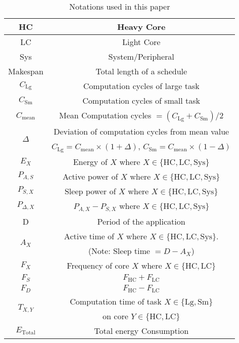 \begin{table}[t]
\caption{Notations used in this paper}
\label{table:notation}
\centering
\noindent\begin{tabular}{|c|c|}
\hline 
HC & Heavy Core \\ 
\hline 
LC & Light Core \\ 
\hline 
Sys & System/Peripheral \\ 
\hline 
Makespan & Total length of a schedule \\ 
\hline  
$C_\mathrm{Lg}$ & Computation cycles of large task\\ 
\hline 
$C_\mathrm{Sm}$ & Computation cycles of small task\\ 
\hline 
$C_\mathrm{mean}$ & Mean Computation cycles $= (C_\mathrm{Lg}+C_\mathrm{Sm})/2$  \\ 
\hline  
\multirow{2}{*}{$\Delta$}& \footnotesize Deviation of computation cycles from mean value\\ &\footnotesize$C_\mathrm{Lg}=C_\mathrm{mean}\times(1+\Delta)$, $C_\mathrm{Sm}=C_\mathrm{mean}\times(1-\Delta)$\\
\hline
$E_X$ & \footnotesize Energy of $X$ where $X\in \{\mathrm{HC},\mathrm{LC}, \mathrm{Sys}\}$ \\ 
\hline
$P_{A, S}$ & \footnotesize Active power of $X$ where $X\in \{\mathrm{HC},\mathrm{LC}, \mathrm{Sys}\}$\\ 
\hline 
$P_{S, X}$ & \footnotesize Sleep power of $X$ where $X\in \{\mathrm{HC},\mathrm{LC}, \mathrm{Sys}\}$ \\ 
\hline
$P_{\Delta,X}$& $P_{A, X}-P_{S, X}$ where $X\in \{\mathrm{HC},\mathrm{LC}, \mathrm{Sys}\}$\\
\hline  
D & Period of the application \\ 
\hline 
\multirow{2}{*}{$A_{X}$} & \footnotesize Active time of $X$ where $X\in \{\mathrm{HC},\mathrm{LC}, \mathrm{Sys}\}$.\\& (Note: Sleep time $= D-A_{X}$) \\ 
\hline
$F_{X}$ & Frequency of core $X$ where $X\in\{\mathrm{HC, LC}\}$ \\ 
\hline
$F_{S}$ & $F_{\mathrm{HC}} + F_{\mathrm{LC}}$ \\
\hline
$F_{D}$ & $F_{\mathrm{HC}} - F_{\mathrm{LC}}$ \\
\hline
\multirow{2}{*}{$T_{X,Y}$} & Computation time of task $X\in\{\mathrm{Lg, Sm}\}$\\& on core $Y\in\{\mathrm{HC, LC}\}$ \\ 
\hline
$E_\mathrm{Total}$ & Total energy Consumption \\ 
\hline
\end{tabular} 
\end{table}